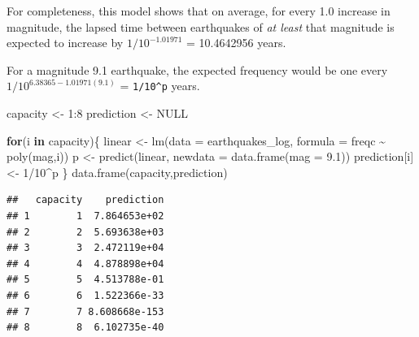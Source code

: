 \documentclass[
]{article}
\newenvironment{Shaded}{\begin{snugshade}}{\end{snugshade}}
\newcommand{\AttributeTok}[1]{\textcolor[rgb]{0.77,0.63,0.00}{#1}}
\newcommand{\ConstantTok}[1]{\textcolor[rgb]{0.00,0.00,0.00}{#1}}
\newcommand{\ControlFlowTok}[1]{\textcolor[rgb]{0.13,0.29,0.53}{\textbf{#1}}}
\newcommand{\DecValTok}[1]{\textcolor[rgb]{0.00,0.00,0.81}{#1}}
\newcommand{\FloatTok}[1]{\textcolor[rgb]{0.00,0.00,0.81}{#1}}
\newcommand{\FunctionTok}[1]{\textcolor[rgb]{0.00,0.00,0.00}{#1}}
\newcommand{\NormalTok}[1]{#1}
\newcommand{\OtherTok}[1]{\textcolor[rgb]{0.56,0.35,0.01}{#1}}
\newcommand{\SpecialCharTok}[1]{\textcolor[rgb]{0.00,0.00,0.00}{#1}}
\begin{document}
For completeness, this model shows that on average, for every 1.0
increase in magnitude, the lapsed time between earthquakes of \emph{at
least} that magnitude is expected to increase by \(1/10^{-1.01971}\) =
10.4642956 years.

For a magnitude 9.1 earthquake, the expected frequency would be one
every \(1/10^{6.38365-1.01971(9.1)}\) = \texttt{1/10\^{}p} years.

\begin{Shaded}
\begin{Highlighting}[]
\NormalTok{capacity }\OtherTok{\textless{}{-}} \DecValTok{1}\SpecialCharTok{:}\DecValTok{8}
\NormalTok{prediction }\OtherTok{\textless{}{-}} \ConstantTok{NULL}

\ControlFlowTok{for}\NormalTok{(i }\ControlFlowTok{in}\NormalTok{ capacity)\{}
\NormalTok{  linear }\OtherTok{\textless{}{-}} \FunctionTok{lm}\NormalTok{(}\AttributeTok{data =}\NormalTok{ earthquakes\_log, }\AttributeTok{formula =}\NormalTok{ freqc }\SpecialCharTok{\textasciitilde{}} \FunctionTok{poly}\NormalTok{(mag,i))}
\NormalTok{  p }\OtherTok{\textless{}{-}} \FunctionTok{predict}\NormalTok{(linear, }\AttributeTok{newdata =} \FunctionTok{data.frame}\NormalTok{(}\AttributeTok{mag =} \FloatTok{9.1}\NormalTok{))}
\NormalTok{  prediction[i] }\OtherTok{\textless{}{-}} \DecValTok{1}\SpecialCharTok{/}\DecValTok{10}\SpecialCharTok{\^{}}\NormalTok{p}
\NormalTok{\}}
\FunctionTok{data.frame}\NormalTok{(capacity,prediction)}
\end{Highlighting}
\end{Shaded}

\begin{verbatim}
##   capacity    prediction
## 1        1  7.864653e+02
## 2        2  5.693638e+03
## 3        3  2.472119e+04
## 4        4  4.878898e+04
## 5        5  4.513788e-01
## 6        6  1.522366e-33
## 7        7 8.608668e-153
## 8        8  6.102735e-40
\end{verbatim}
\end{document}
